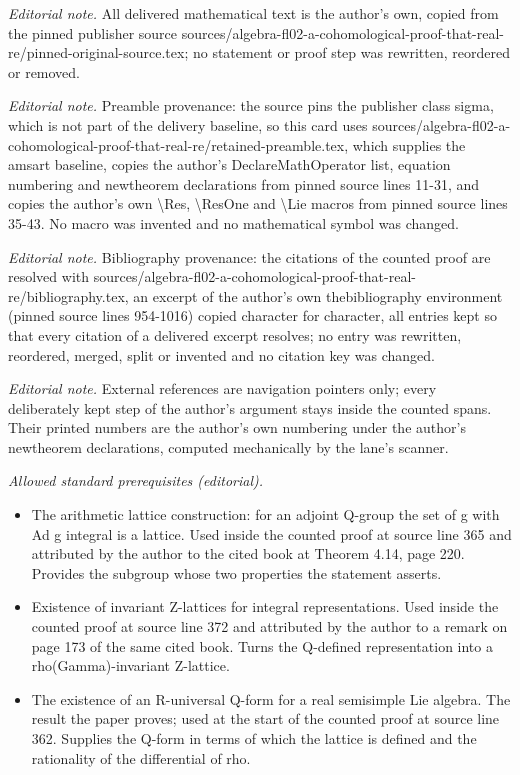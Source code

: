 \maketitle
\noindent\textit{Editorial note.} All delivered mathematical text is the author's own, copied from the pinned publisher source sources/algebra-fl02-a-cohomological-proof-that-real-re/pinned-original-source.tex; no statement or proof step was rewritten, reordered or removed.\par\medskip
\noindent\textit{Editorial note.} Preamble provenance: the source pins the publisher class sigma, which is not part of the delivery baseline, so this card uses sources/algebra-fl02-a-cohomological-proof-that-real-re/retained-preamble.tex, which supplies the amsart baseline, copies the author's DeclareMathOperator list, equation numbering and newtheorem declarations from pinned source lines 11-31, and copies the author's own \textbackslash{}Res, \textbackslash{}ResOne and \textbackslash{}Lie macros from pinned source lines 35-43. No macro was invented and no mathematical symbol was changed.\par\medskip
\noindent\textit{Editorial note.} Bibliography provenance: the citations of the counted proof are resolved with sources/algebra-fl02-a-cohomological-proof-that-real-re/bibliography.tex, an excerpt of the author's own thebibliography environment (pinned source lines 954-1016) copied character for character, all entries kept so that every citation of a delivered excerpt resolves; no entry was rewritten, reordered, merged, split or invented and no citation key was changed.\par\medskip
\noindent\textit{Editorial note.} External references are navigation pointers only; every deliberately kept step of the author's argument stays inside the counted spans. Their printed numbers are the author's own numbering under the author's newtheorem declarations, computed mechanically by the lane's scanner.\par\medskip
\noindent\textit{Allowed standard prerequisites (editorial).}\begin{itemize}
\item The arithmetic lattice construction: for an adjoint Q-group the set of g with Ad g integral is a lattice. Used inside the counted proof at source line 365 and attributed by the author to the cited book at Theorem 4.14, page 220. Provides the subgroup whose two properties the statement asserts.
\item Existence of invariant Z-lattices for integral representations. Used inside the counted proof at source line 372 and attributed by the author to a remark on page 173 of the same cited book. Turns the Q-defined representation into a rho(Gamma)-invariant Z-lattice.
\item The existence of an R-universal Q-form for a real semisimple Lie algebra. The result the paper proves; used at the start of the counted proof at source line 362. Supplies the Q-form in terms of which the lattice is defined and the rationality of the differential of rho.
\end{itemize}\medskip
